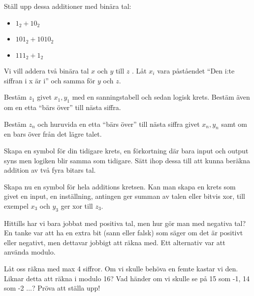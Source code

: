 \begin{problem}
	Ställ upp dessa additioner med binära tal:
	\begin{itemize}
		\item \(1_2 + 10_2\) 
		\item \(101_2 + 1010_2\) 
		\item \(111_2 + 1_2\) 
	\end{itemize}
\end{problem}


	Vi vill addera två binära tal \(x\) och \(y\) till \(z\) . Låt \(x_i\) vara påståendet ``Den i:te siffran i x är i'' och samma för \(y\) och \(z\). 

\begin{problem}
	Bestäm \(z_1\) givet \(x_1, y_1\) med en sanningstabell och sedan logisk krets. Bestäm även om en etta ``bärs över'' till nästa siffra.
\end{problem}

\begin{problem}
	Bestäm \(z_n\) och huruvida en etta ``bärs över'' till nästa siffra givet \(x_n, y_n\) samt om en bars över från det lägre talet.  
\end{problem}

\begin{problem}
	Skapa en symbol för din tidigare krets, en förkortning där bara input och output syns men logiken blir samma som tidigare. Sätt ihop dessa till att kunna beräkna addition av två fyra bitars tal.
\end{problem}

\begin{problem}
	Skapa nu en symbol för hela additions kretsen. Kan man skapa en krets som givet en input, en inställning, antingen ger summan av talen eller bitvis xor, till exempel \(x_3\) och \(y_3\) ger xor till \(z_3\).
\end{problem}

\begin{problem}[Extra]
	Hittills har vi bara jobbat med positiva tal, men hur gör man med negativa tal? En tanke var att ha en extra bit (sann eller falsk) som säger om det är positivt eller negativt, men dettavar jobbigt att räkna med. Ett alternativ var att använda modulo.
	
	Låt oss räkna med max 4 siffror. Om vi skulle behöva en femte kastar vi den. Liknar detta att räkna i modulo 16? Vad händer om vi skulle se på 15 som -1, 14 som -2 \(\dots\)? Pröva att ställa upp!
\end{problem}

